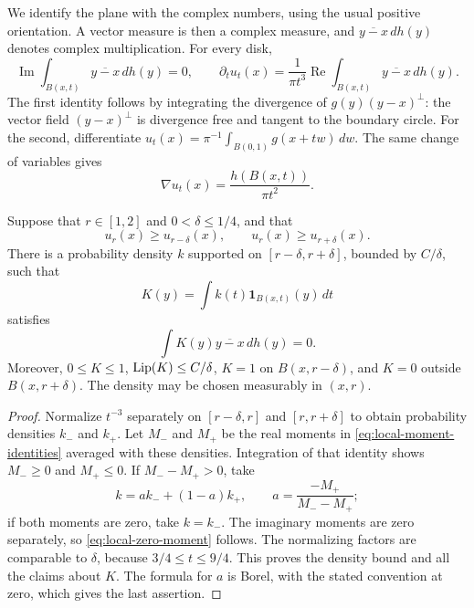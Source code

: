 We identify the plane with the complex numbers, using the usual positive
orientation. A vector measure is then a complex measure, and
$\overline{y-x}\,dh(y)$ denotes complex multiplication. For every disk,
\begin{equation}\label{eq:local-moment-identities}
\operatorname{Im}\int_{B(x,t)}\overline{y-x}\,dh(y)=0,
\qquad
\partial_tu_t(x)=\frac1{\pi t^3}
 \operatorname{Re}\int_{B(x,t)}\overline{y-x}\,dh(y).
\end{equation}
The first identity follows by integrating the divergence of
$g(y)(y-x)^\perp$: the vector field $(y-x)^\perp$ is divergence free
and tangent to the boundary circle. For the second, differentiate
$u_t(x)=\pi^{-1}\int_{B(0,1)}g(x+tw)\,dw$.
The same change of variables gives
\begin{equation}\label{eq:local-spatial-gradient}
\nabla u_t(x)=\frac{h(B(x,t))}{\pi t^2}.
\end{equation}

\begin{lemma}\label{lem:local-balanced}
Suppose that $r\in[1,2]$ and $0<\delta\le1/4$, and that
\[
u_r(x)\ge u_{r-\delta}(x),\qquad u_r(x)\ge u_{r+\delta}(x).
\]
There is a probability
density $k$ supported on $[r-\delta,r+\delta]$, bounded by $C/\delta$,
such that
\[
K(y)=\int k(t)\mathbf1_{B(x,t)}(y)\,dt
\]
satisfies
\begin{equation}\label{eq:local-zero-moment}
\int K(y)\overline{y-x}\,dh(y)=0.
\end{equation}
Moreover, $0\le K\le1$, $\operatorname{Lip}(K)\le C/\delta$,
$K=1$ on $B(x,r-\delta)$, and $K=0$ outside $B(x,r+\delta)$.
The density may be chosen measurably in $(x,r)$.
\end{lemma}

\begin{proof}
Normalize $t^{-3}$ separately on $[r-\delta,r]$ and
$[r,r+\delta]$ to obtain probability densities $k_-$ and $k_+$.
Let $M_-$ and $M_+$ be the real moments in
\eqref{eq:local-moment-identities} averaged with these densities.
Integration of that identity shows $M_-\ge0$ and $M_+\le0$.
If $M_--M_+>0$, take
\[
k=a k_-+(1-a)k_+,
\qquad a=\frac{-M_+}{M_--M_+};
\]
if both moments are zero, take $k=k_-$. The imaginary moments are
zero separately, so \eqref{eq:local-zero-moment} follows. The
normalizing factors are comparable to $\delta$, because
$3/4\le t\le9/4$. This proves the density bound and all the claims
about $K$. The formula for $a$ is Borel, with the stated convention
at zero, which gives the last assertion.
\end{proof}


